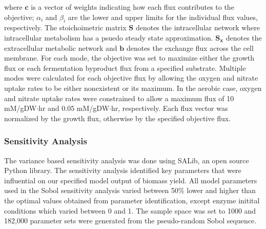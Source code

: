 \documentclass[10pt,twocolumn,twoside,final]{IEEEtran}
\begin{document}
where $\boldsymbol{c}$ is a vector of weights indicating how each flux contributes to the objective; $\alpha_i$ and $\beta_i$ are the lower and upper limits for the individual flux values, respectively. 
The stoichoimetric matrix $\mathbf{S}$ denotes the intracellular network where intracellular metabolism has a psuedo steady state approximation. 
$\mathbf{S_{x}}$ denotes the extracellular metabolic network and $\mathbf{b}$ denotes the exchange flux across the cell membrane. 
For each mode, the objective was set to maximize either the growth flux or each fermentation byproduct flux from a specified substrate.
Multiple modes were calculated for each objective flux by allowing the oxygen and nitrate uptake rates to be either nonexistent or its maximum.
In the aerobic case, oxygen and nitrate uptake rates were constrained to allow a maximum flux of 10 mM/gDW$\cdot$hr and 0.05 mM/gDW$\cdot$hr, respectively. 
Each flux vector was normalized by the growth flux, otherwise by the specified objective flux.
   
\subsubsection*{Sensitivity Analysis}
The variance based sensitivity analysis\cite{2010_saltelli} was done using SALib, an open source Python library. The sensitivity analysis identified key parameters that were influential on our specified model output of biomass yield. All model parameters used in the Sobol sensitivity analysis varied between 50\% lower and higher than the optimal values obtained from parameter identification, except enzyme initital conditions which varied between 0 and 1. The sample space was set to 1000 and 182,000 parameter sets were generated from the pseudo-random Sobol sequence.    
\end{document}
